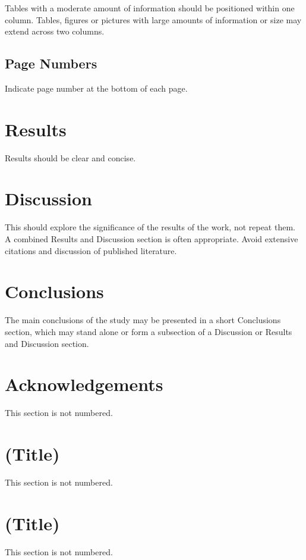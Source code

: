 \documentclass[twocolumn, 10pt]{article}
\begin{document}
Tables with a moderate amount of information should be positioned within one column. Tables, figures or pictures with large amounts of information or size may extend across two columns.

\subsection{Page Numbers}
Indicate page number at the bottom of each page.

\section{Results}
Results should be clear and concise.

\section{Discussion}
This should explore the significance of the results of the work, not repeat them. A combined Results and Discussion section is often appropriate. Avoid extensive citations and discussion of published literature.

\section{Conclusions}
The main conclusions of the study may be presented in a short Conclusions section, which may stand alone or form a subsection of a Discussion or Results and Discussion section.

\section*{Acknowledgements}
This section is not numbered.

\setcounter{equation}{0}
\renewcommand\theequation{A.\arabic{equation}}

\appendix
{}

\section{(Title)}
This section is not numbered.

\section{(Title)}
This section is not numbered.
\end{document}
